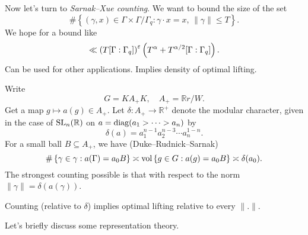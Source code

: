 \documentclass[reqno]{amsart} 
\begin{document}
Now let's turn to \emph{Sarnak--Xue counting}.  We want to bound the size of the set
\begin{equation*}
  \# \left\{ (\gamma, x ) \in \Gamma \times \Gamma / \Gamma_q
    :
    \gamma \cdot x = x, \,
    \lVert \gamma  \rVert \leq T
  \right\}.
\end{equation*}
We hope for a bound like
\begin{equation*}
  \ll \left( T [\Gamma : \Gamma_q ] \right)^\varepsilon
  \left( T^\alpha + T^{\alpha / 2 } [\Gamma : \Gamma_q] \right).
\end{equation*}
Can be used for other applications.  Implies density of optimal lifting.

Write
\begin{equation*}
  G = K A_+ K,
  \quad
  A_+ = \mathbb{R} r / W.
\end{equation*}
Get a map $g \mapsto a(g) \in A_+$.  Let $\delta : A_+ \rightarrow \mathbb{R}^+$ denote the modular character, given in the case of $\operatorname{SL}_n(\mathbb{R})$ on $a = \operatorname{diag}(a_1 > \dotsb > a_n)$ by
\begin{equation*}
\delta(a) = a_1^{n - 1 } a_2^{n - 3 } \dotsb a_n^{1 - n}.
\end{equation*}
For a small ball $B \subseteq A_+$, we have (Duke--Rudnick--Sarnak)
\begin{equation*}
  \#  \left\{ \gamma \in \gamma : a (\Gamma) = a_0 B \right\}
  \asymp \operatorname{vol} \left\{ g \in G : a (g) = a_0 B \right\}
  \asymp
  \delta (a_0).
\end{equation*}
The strongest counting possible is that with respect to the norm $\lVert \gamma \rVert = \delta (a (\gamma ))$.

\begin{proposition}\label{proposition:cj4460l81z}
  Counting (relative to $\delta$) implies optimal lifting relative to every $\lVert . \rVert$.
\end{proposition}

Let's briefly discuss some representation theory.
\end{document}
